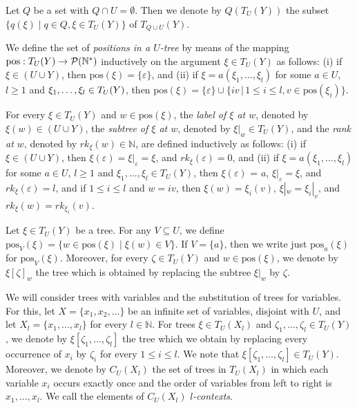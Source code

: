 \documentclass[10pt]{scrartcl}
\newcommand{\nat}{\mathbb{N}}
\newcommand{\pos}{\mathrm{pos}}
\begin{document}
Let $Q$ be a set with $Q\cap U=\emptyset$.  Then we denote by $Q(T_U(Y))$ the subset $\{q(\xi) \mid q\in Q, \xi \in T_U(Y)\}$ of $T_{Q\cup U}(Y)$. 


We define the set of {\em positions in a  $U$-tree} by means
of the mapping $\mathrm{pos}: T_U(Y)\rightarrow {\cal P}(\nat^*)$ inductively on the argument $\xi \in T_U(Y)$ as follows: (i) if  $\xi \in (U\cup Y)$, then
$\pos(\xi)=\{\varepsilon\}$, and (ii) if $\xi = a(\xi_1,\ldots,\xi_l)$ for some $a \in U$, $l \ge 1$
and $\xi_{1},\ldots,\xi_{l}\in T_U(Y)$, then $\mathrm{pos}(\xi) = \{\varepsilon\} \cup \{iv \, | \, 1 \le i \le l, v \in \mathrm{pos}(\xi_i)\}$. 

For every $\xi \in T_U(Y)$ and $w \in \mathrm{pos}(\xi)$, the {\it
  label of $\xi$ at   $w$}, denoted by $\xi(w) \in (U\cup Y)$, the {\it
  subtree of $\xi$ at   $w$}, denoted by $\xi|_w \in T_U(Y)$, 
and the {\it
  rank at $w$}, denoted by $rk_\xi(w)\in \nat$, are defined inductively as follows: (i) if  $\xi \in (U\cup Y)$, then
$\xi(\varepsilon) = \xi|_\varepsilon = \xi$, and $rk_\xi(\varepsilon) = 0$, and
(ii) if $\xi = a(\xi_1,\ldots,\xi_l)$ for some $a \in U$,
$l \ge 1$ and $\xi_1,\ldots,\xi_l \in T_U(Y)$,  then
$\xi(\varepsilon)$ = $a$, $\xi|_\varepsilon = \xi$, and $rk_\xi(\varepsilon) = l$, and if  $1
\le i \le l$ and $w = iv$, then $\xi(w) = \xi_i(v)$, $\xi|_w = \xi_i|_v$, and $rk_\xi(w) = rk_{\xi_i}(v)$. 


Let $\xi \in T_U(Y)$ be a tree. For any $V \subseteq U$, we define $\pos_V(\xi)=\{ w\in \pos(\xi) \mid \xi(w) \in V\}$. If $V=\{a\}$, then we write just $\pos_a(\xi)$ for $\pos_V(\xi)$. 
Moreover, for every $\zeta \in T_U(Y)$ and $w\in \pos(\xi)$, we denote by $\xi[\zeta ]_w$ the tree which is obtained by replacing the subtree $\xi|_w$ by $\zeta$.

We will consider trees with variables and the substitution of trees for variables. For this, let $X = \{x_1,x_2,\ldots\}$ be an infinite set of variables, disjoint with $U$, and let  $X_l = \{x_1,\ldots,x_l\}$ for every $l \in \nat$. For trees $\xi \in T_U(X_l)$ and $\zeta_1,\ldots,\zeta_l \in  T_U(Y)$, we denote by
$\xi[\zeta_1,\ldots,\zeta_l]$ the tree which we obtain by replacing  every occurrence of $x_i$ by $\zeta_i$ for every $1\le i\le l$. We note that $\xi[\zeta_1,\ldots,\zeta_l] \in T_U(Y)$. Moreover, we denote by $C_U(X_l)$ the set of trees in $T_U(X_l)$ in which each variable $x_i$ occurs exactly once and the order of variables from left to right is $x_1,\ldots,x_l$. We call the elements of 
$C_U(X_l)$ {\em $l$-contexts}.
\end{document}
